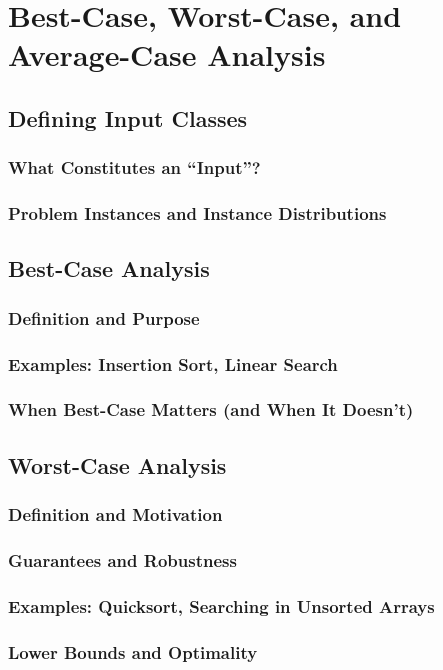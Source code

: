 
\chapter{Best-Case, Worst-Case, and Average-Case Analysis}
\section{Defining Input Classes}
\subsection{What Constitutes an ``Input''?}
\subsection{Problem Instances and Instance Distributions}

\section{Best-Case Analysis}
\subsection{Definition and Purpose}
\subsection{Examples: Insertion Sort, Linear Search}
\subsection{When Best-Case Matters (and When It Doesn't)}

\section{Worst-Case Analysis}
\subsection{Definition and Motivation}
\subsection{Guarantees and Robustness}
\subsection{Examples: Quicksort, Searching in Unsorted Arrays}
\subsection{Lower Bounds and Optimality}

